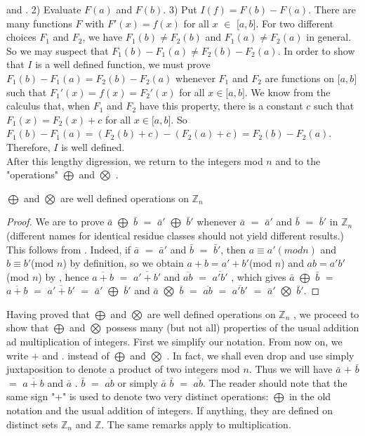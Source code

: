 \documentclass[11pt]{amsbook}
\begin{document}
	and . 2) Evaluate $F(a)$ and $F(b)$. 3) Put $I(f) = F(b) - F(a)$. There are many functions $F$ with $F'(x) = f(x)$ for all $x$ $\in$ $\lbrack a,b\rbrack $. For two different choices $F_1$ and $F_2$, we have $F_1(b) \neq F_2(b)$ and $F_1(a) \neq F_2(a)$ in general. So we may suspect that $F_1(b) - F_1(a) \neq F_2(b) - F_2(a)$. In order to show that $I$ is a well defined function, we must prove $F_1(b) - F_1(a) = F_2(b) - F_2(a)$ whenever $F_1$ and $F_2$ are functions on $\lbrack a,b \rbrack$ such that $F_1'(x) = f(x) = F_2'(x) $ for all $x \in \lbrack a,b \rbrack$. We know from the calculus that, when $F_1$ and $F_2$ have this property, there is a constant $c$ such that $F_1(x) = F_2(x) + c$ for all $x \in \lbrack a,b \rbrack$. So $F_1(b) - F_1(a) = (F_2(b) + c) - (F_2(a) + c) = F_2(b) - F_2(a)$. Therefore, $I$ is well defined. \\
	
	After this lengthy digression, we return to the integers mod $n$ and to the "operations" $\bigoplus$ and $\bigotimes$ .
	\begin{lem} 
		$\bigoplus$ and $\bigotimes$ are well defined operations on $\mathbb{Z}_n$ \\
	\end{lem}  
		\begin{proof}
			We are to prove $\bar{a}$ $\bigoplus$ $\bar{b}$ $=$ $\bar{a}'$ $\bigoplus$ $\bar{b}'$ whenever $\bar{a}$ $=$ $\bar{a}'$ and $\bar{b}$ $=$ $\bar{b}'$ in $\mathbb{Z}_n$ (different names for identical residue classes should not yield different results.) This follows from . Indeed, if $\bar{a}$ $=$ $\bar{a}'$ and $\bar{b}$ $=$ $\bar{b}'$, then $a \equiv a'(mod n)$   and $b \equiv b'$(mod $n$) by definition, so we obtain $a +b = a' + b'$(mod $n$) and $ab = a'b'$(mod $n$) by , hence  $\overline{a+b}$ $=$ $\overline{a'+b'}$  and  $\overline{ab}$ $=$ $\overline{a'b'}$  , which gives $\bar{a}$ $\bigoplus$ $\bar{b}$ $=$ $\overline{a+b}$ $=$ $\overline{a'+b'}$ $=$ $\bar{a}'$ $\bigoplus$ $\bar{b}'$ and $\bar{a}$ $\bigotimes$ $\bar{b}$ $=$ $\overline{ab}$ $=$ $\overline{a'b'}$ $=$ $\bar{a}'$ $\bigotimes$ $\bar{b}'$.
		\end{proof}
		Having proved that $\bigoplus$ and $\bigotimes$ are well defined operations on $\mathbb{Z}_n$ , we proceed to show that $\bigoplus$ and $\bigotimes$ possess many (but not all) properties of the usual addition ad multiplication of integers. First we simplify our notation. From now on, we write $+$ and $.$ instead of $\bigoplus$ and $\bigotimes$ . In fact, we shall even drop and use simply juxtaposition to denote a product of two integers mod $n$. Thus we will have $\bar{a}$ $+$ $\bar{b}$ $=$ $\overline{a+b}$ and $\bar{a}$ $.$ $\bar{b}$ $=$ $\overline{ab}$ or simply $\bar{a}$  $\bar{b}$ $=$ $\overline{ab}$. The reader should note that the same sign "+" is used to denote two very distinct operations: $\bigoplus$ in the old notation and the usual addition of integers. If anything, they are defined on distinct sets $\mathbb{Z}_n$ and $\mathbb{Z}$. The same remarks apply to multiplication.
	
	
\end{document}
